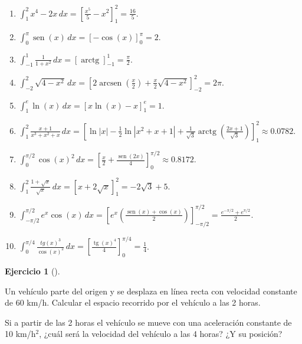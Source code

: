 \documentclass[
  spanish,
  a4paper,
]{scrreport}
\theoremstyle{definition}
\newtheorem{exercise}{Ejercicio}[chapter]
\theoremstyle{remark}
\begin{document}
\begin{tcolorbox}[enhanced jigsaw, arc=.35mm, bottomrule=.15mm, bottomtitle=1mm, breakable, colback=white, colbacktitle=quarto-callout-tip-color!10!white, colframe=quarto-callout-tip-color-frame, coltitle=black, left=2mm, leftrule=.75mm, opacityback=0, opacitybacktitle=0.6, rightrule=.15mm, title=\textcolor{quarto-callout-tip-color}{\faLightbulb}\hspace{0.5em}{Solución}, titlerule=0mm, toprule=.15mm, toptitle=1mm]

\begin{enumerate}
\def\labelenumi{\alph{enumi}.}
\item
  \(\int_1^2 x^4-2x\,dx = \left[\frac{x^5}{5}-x^2\right]_1^2 = \frac{16}{5}\).
\item
  \(\int_0^{\pi} \operatorname{sen}(x)\, dx = \left[-\cos(x)\right]_0^\pi = 2\).
\item
  \(\int_{-1}^1 \frac{1}{1+x^2}\,dx = \left[\operatorname{arctg}\right]_{-1}^1 = \frac{\pi}{2}\).
\item
  \(\int_{-2}^2 \sqrt{4-x^2}\,dx = \left[2\operatorname{arcsen}\left(\frac{x}{2}\right)+\frac{x}{2}\sqrt{4-x^2}\right]_{-2}^2 = 2\pi\).
\item
  \(\int_1^e \ln(x)\,dx = \left[x\ln(x)-x\right]_1^e = 1\).
\item
  \(\int_1^2 \frac{x+1}{x^3+x^2+x}\,dx = \left[\ln|x| - \frac{1}{2}\ln|x^2+x+1|+\frac{1}{\sqrt{3}}\operatorname{arctg}\left(\frac{2x+1}{\sqrt{3}}\right) \right]_1^2 \approx 0.0782.\)
\item
  \(\int_0^{\pi/2} \cos(x)^2\, dx = \left[\frac{x}{2}+\frac{\operatorname{sen}(2x)}{4}\right]_0^{\pi/2} \approx 0.8172.\)
\item
  \(\int_1^2 \frac{1+\sqrt{x}}{\sqrt{x}}\,dx = \left[x+2\sqrt{x}\right]_1^2 = -2\sqrt{3}+5\).
\item
  \(\int_{-\pi/2}^{\pi/2} e^x\cos(x)\,dx = \left[e^x\left(\frac{\operatorname{sen}(x)+\cos(x)}{2}\right)\right]_{-\pi/2}^{\pi/2} = \frac{e^{-\pi/2}+e^{\pi/2}}{2}\).
\item
  \(\int_{0}^{\pi/4}\frac{tg(x)^3}{\cos(x)^2}\,dx = \left[\frac{\operatorname{tg}(x)^4}{4}\right]_0^{\pi/4} = \frac{1}{4}\).
\end{enumerate}

\end{tcolorbox}

\begin{exercise}[]\protect\hypertarget{exr-espacio-recorrido-movil}{}\label{exr-espacio-recorrido-movil}

Un vehículo parte del origen y se desplaza en línea recta con velocidad
constante de 60 km/h. Calcular el espacio recorrido por el vehículo a
las 2 horas.

Si a partir de las 2 horas el vehículo se mueve con una aceleración
constante de 10 km/h\(^2\), ¿cuál será la velocidad del vehículo a las 4
horas? ¿Y su posición?

\end{exercise}
\end{document}
